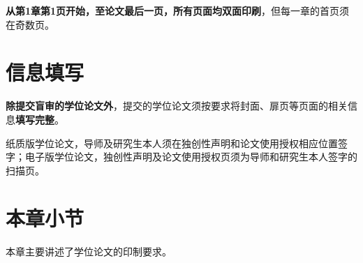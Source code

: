 \textbf{从第1章第1页开始，至论文最后一页，所有页面均双面印刷}，但每一章的首页须在奇数页。

\section{信息填写}

\textbf{除提交盲审的学位论文外}，提交的学位论文须按要求将封面、扉页等页面的相关信息\textbf{填写完整}。

纸质版学位论文，导师及研究生本人须在独创性声明和论文使用授权相应位置签字；电子版学位论文，独创性声明及论文使用授权页须为导师和研究生本人签字的扫描页。

\section{本章小节}

本章主要讲述了学位论文的印制要求。